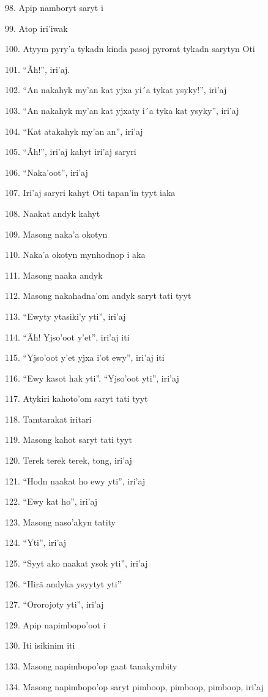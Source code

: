 98. Apip namboryt saryt i

99. Atop iri'iwak

100. Atyym pyry'a tykadn kinda pasoj pyrorat tykadn sarytyn Oti

101. ``Ãh!'', iri'aj.

102. ``An nakahyk my'an kat yjxa yi´a tykat ysyky!'', iri'aj

103. ``An nakahyk my'an kat yjxaty i´a tyka kat ysyky'', iri'aj

104. ``Kat atakahyk my'an an'', iri'aj

105. ``Ãh!'', iri'aj kahyt iri'aj saryri

106. ``Naka'oot'', iri'aj

107. Iri'aj saryri kahyt Oti tapan'in tyyt iaka

108. Naakat andyk kahyt

109. Masong naka'a okotyn

110. Naka'a okotyn mynhodnop i aka

111. Masong naaka andyk

112. Masong nakahadna'om andyk saryt tati tyyt

113. ``Ewyty ytasiki'y yti'', iri'aj

114. ``Ãh! Yjso'oot y'et'', iri'aj iti

115. ``Yjso'oot y'et yjxa i'ot ewy'', iri'aj iti

116. ``Ewy kasot hak yti''.  ``Yjso'oot yti'', iri'aj

117. Atykiri kahoto'om saryt tati tyyt

118. Tamtarakat iritari

119. Masong kahot saryt tati tyyt

120. Terek terek terek, tong, iri'aj

121. ``Hodn naakat ho ewy yti'', iri'aj

122. ``Ewy kat ho'', iri'aj

123. Masong naso'akyn tatity

124. ``Yti'', iri'aj

125. ``Syyt ako naakat ysok yti'', iri'aj

126. ``Hirã andyka ysyytyt yti''

127. ``Ororojoty yti'', iri'aj

129. Apip napimbopo'oot i

130. Iti isikinim iti

133. Masong napimbopo'op gaat tanakymbity

134. Masong napimbopo'op saryt pimboop, pimboop, pimboop, iri'aj

